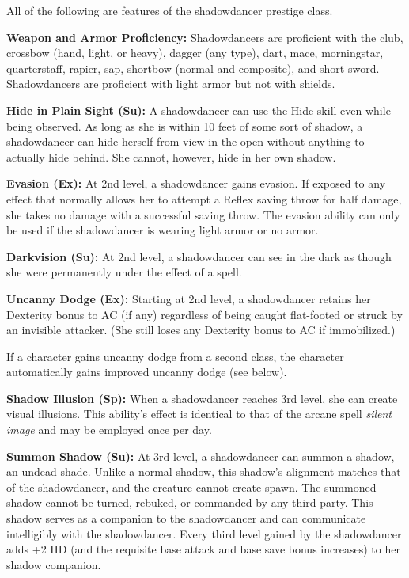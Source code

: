 \ClassFeatures

All of the following are features of the shadowdancer prestige class.

\textbf{Weapon and Armor Proficiency:} Shadowdancers are proficient with the club, 
crossbow (hand, light, or heavy), dagger (any type), dart, mace, morningstar, quarterstaff, 
rapier, sap, shortbow (normal and composite), and short sword. Shadowdancers are 
proficient with light armor but not with shields.

\textbf{Hide in Plain Sight (Su):} A shadowdancer can use the Hide skill even while 
being observed. As long as she is within 10 feet of some sort of shadow, a shadowdancer 
can hide herself from view in the open without anything to actually hide behind. 
She cannot, however, hide in her own shadow.

\textbf{Evasion (Ex):} At 2nd level, a shadowdancer gains evasion. If exposed to 
any effect that normally allows her to attempt a Reflex saving throw for half damage, 
she takes no damage with a successful saving throw. The evasion ability can only 
be used if the shadowdancer is wearing light armor or no armor.

\textbf{Darkvision (Su):} At 2nd level, a shadowdancer can see in the dark as though 
she were permanently under the effect of a  spell.

\textbf{Uncanny Dodge (Ex):} Starting at 2nd level, a shadowdancer retains her 
Dexterity bonus to AC (if any) regardless of being caught flat-footed or struck 
by an invisible attacker. (She still loses any Dexterity bonus to AC if immobilized.)

If a character gains uncanny dodge from a second class, the character automatically 
gains improved uncanny dodge (see below).

\textbf{Shadow Illusion (Sp):} When a shadowdancer reaches 3rd 
level, she can create visual illusions. This ability's effect is identical to that 
of the arcane spell \textit{silent image} and may be employed once per day.

\textbf{Summon Shadow (Su):} At 3rd level, a shadowdancer can summon a shadow, 
an undead shade. Unlike a normal shadow, this shadow's alignment matches that of 
the shadowdancer, and the creature cannot create spawn. The summoned shadow cannot 
be turned, rebuked, or commanded by any third party. This shadow serves as a companion 
to the shadowdancer and can communicate intelligibly with the shadowdancer. Every 
third level gained by the shadowdancer adds +2 HD (and the requisite base attack 
and base save bonus increases) to her shadow companion.

